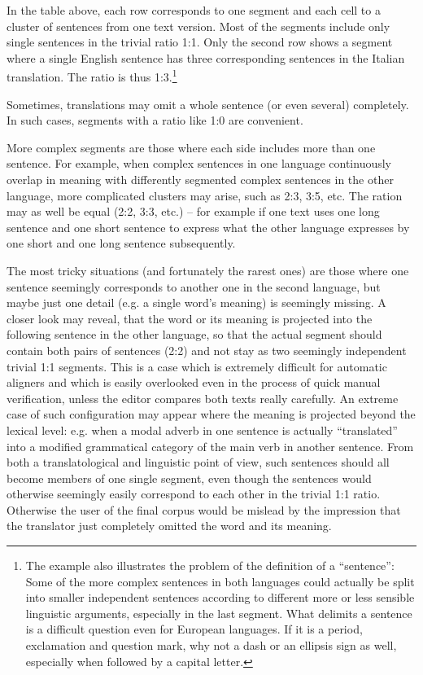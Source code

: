 \documentclass[a4paper,10pt,oneside]{book}
\begin{document}
In the table above, each row corresponds to one segment and each cell to a cluster of sentences from one text version. Most of the segments include only single sentences in the trivial ratio 1:1. Only the second row shows a segment where a single English sentence has three corresponding sentences in the Italian translation. The ratio is thus 1:3.\footnote{The example also illustrates the problem of the definition of a ``sentence'': Some of the more complex sentences in both languages could actually be split into smaller independent sentences according to different more or less sensible linguistic arguments, especially in the last segment. What delimits a sentence is a difficult question even for European languages. If it is a period, exclamation and question mark, why not a dash or an ellipsis sign as well, especially when followed by a capital letter.}

Sometimes, translations may omit a whole sentence (or even several) completely. In such cases, segments with a ratio like 1:0 are convenient.

More complex segments are those where each side includes more than one sentence. For example, when complex sentences in one language continuously overlap in meaning with differently segmented complex sentences in the other language, more complicated clusters may arise, such as 2:3, 3:5, etc. The ration may as well be equal (2:2, 3:3, etc.) -- for example if one text uses one long sentence and one short sentence to express what the other language expresses by one short and one long sentence subsequently.   

The most tricky situations (and fortunately the rarest ones) are those where one sentence seemingly corresponds to another one in the second language, but maybe just one detail (e.g. a single word's meaning) is seemingly missing. A closer look may reveal, that the word or its meaning is projected into the following sentence in the other language, so that the actual segment should contain both pairs of sentences (2:2) and not stay as two seemingly independent trivial 1:1 segments. This is a case which is extremely difficult for automatic aligners and which is easily overlooked even in the process of quick manual verification, unless the editor compares both texts really carefully. An extreme case of such configuration may appear where the meaning is projected beyond the lexical level: e.g. when a modal adverb in one sentence is actually ``translated'' into a modified grammatical category of the main verb in another sentence. From both a translatological and linguistic point of view, such sentences should all 
become members of one single segment, even though the sentences would otherwise seemingly easily correspond to each other in the trivial 1:1 ratio. Otherwise the user of the final corpus would be mislead by the impression that the translator just completely omitted the word and its meaning.
\end{document}
